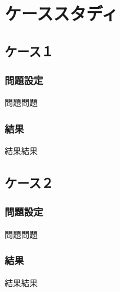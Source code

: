\chapter{ケーススタディ}

\section{ケース１}

\subsection{問題設定}
問題問題

\subsection{結果}
結果結果


\section{ケース２}

\subsection{問題設定}
問題問題

\subsection{結果}
結果結果